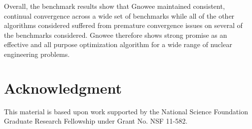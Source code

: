 \documentclass{article}                                                                           %
\begin{document}
Overall, the benchmark results show that Gnowee maintained consistent, continual convergence across a wide set of benchmarks while all of the other algorithms considered suffered from premature convergence issues on several of the benchmarks considered.
Gnowee therefore shows strong promise as an effective and all purpose optimization algorithm for a wide range of nuclear engineering problems. 



%





\section*{Acknowledgment}
This material is based upon work supported by the National Science Foundation Graduate Research Fellowship under Grant No. NSF 11-582.
\end{document}
